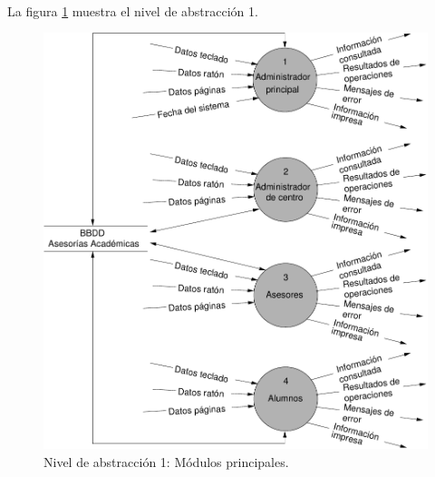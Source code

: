   \paragraph{}La figura \ref{diagramaNivel1} muestra el nivel de abstracción 1.

        \begin{figure}[!ht]
            \begin{center}
            \includegraphics[]{08.Analisis_Funcional/8.2.DFDs/Niveles/Diagramas/nivel1.pdf}
            \caption{Nivel de abstracción 1: Módulos principales.}
            \label{diagramaNivel1}
            \end{center}
         \end{figure}